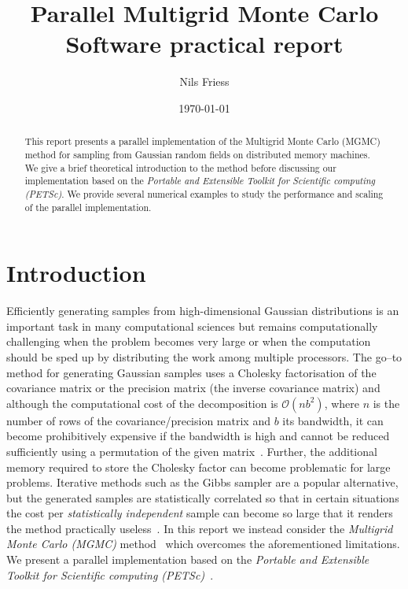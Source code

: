 \documentclass[
fontsize=11pt,
paper=a4,
numbers=noenddot
]{scrartcl}
\title{Parallel Multigrid Monte Carlo\\
{\normalsize Software practical report}}
\date{\small\today}
\author{Nils Friess}
\begin{document}
\maketitle

\begin{abstract}
    This report presents a parallel implementation of the Multigrid Monte Carlo (MGMC) method for sampling from Gaussian random fields on distributed memory machines. 
    We give a brief theoretical introduction to the method before discussing our implementation based on the \emph{Portable and Extensible Toolkit for Scientific computing (PETSc)}. We provide several numerical examples to study the performance and scaling of the parallel implementation.
\end{abstract}

\section{Introduction}
Efficiently generating samples from high-dimensional Gaussian distributions is an important task in many computational sciences but remains computationally challenging when the problem becomes very large
or when the computation should be sped up by distributing the work among multiple processors. The go--to method for generating Gaussian samples uses a Cholesky factorisation of the covariance matrix or the precision matrix (the inverse covariance matrix) and although the computational cost of the decomposition is $\mathcal{O}(nb^2)$, where $n$ is the number of rows of the covariance/precision matrix and $b$ its bandwidth, it can become prohibitively expensive if the bandwidth is high and cannot be reduced sufficiently using a permutation of the given matrix~\cite{golubvanloan,rue2001fast,foxparker}. Further, the additional memory required to store the Cholesky factor can become problematic for large problems. Iterative methods such as the Gibbs sampler are a popular alternative, but the generated samples are statistically correlated so that in certain situations the cost per \emph{statistically independent} sample can become so large that it renders the method practically useless~\cite{foxparker,kazashimuellerscheichl}. In this report we instead consider the \emph{Multigrid Monte Carlo (MGMC)} method~\cite{goodmansokal} which overcomes the aforementioned limitations. We present a parallel implementation based on the \emph{Portable and Extensible Toolkit for Scientific computing (PETSc)}~\cite{petsc-web-page,petsc-user-ref}.
\end{document}
